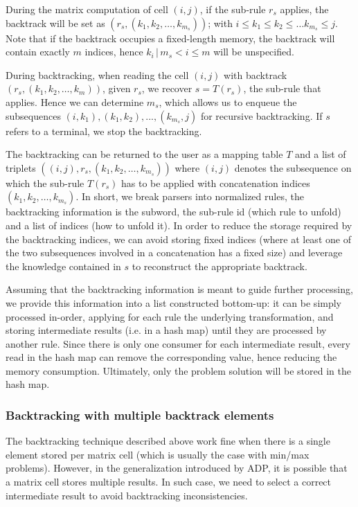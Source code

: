 	\ule
	\item During the matrix computation of cell $(i,j)$, if the sub-rule $r_s$ applies, the backtrack will be set as $(r_s,(k_1,k_2,\ldots,k_{m_s}))$; with $i\le k_1\le k_2\le \ldots k_{m_s}\le j$. Note that if the backtrack occupies a fixed-length memory, the backtrack will contain exactly $m$ indices, hence $k_i\,|\,m_s<i\le m$ will be unspecified.
	\item During backtracking, when reading the cell $(i,j)$ with backtrack $(r_s,(k_1,k_2,\ldots,k_m))$, given $r_s$, we recover $s=T(r_s)$, the sub-rule that applies. Hence we can determine $m_s$, which allows us to enqueue the subsequences $(i,k_1), (k_1,k_2), ..., (k_{m_s},j)$ for recursive backtracking. If $s$ refers to a terminal, we stop the backtracking.
	\item The backtracking can be returned to the user as a mapping table $T$ and a list of triplets $((i,j),r_s,(k_1,k_2,\ldots,k_{m_s}))$ where $(i,j)$ denotes the subsequence on which the sub-rule $T(r_s)$ has to be applied with concatenation indices $(k_1,k_2,\ldots,k_{m_s})$.
\ole
In short, we break parsers into normalized rules, the backtracking information is the subword, the sub-rule id (which rule to unfold) and a list of indices (how to unfold it).
\ule
In order to reduce the storage required by the backtracking indices, we can avoid storing fixed indices (where at least one of the two subsequences involved in a concatenation has a fixed size) and leverage the knowledge contained in $s$ to reconstruct the appropriate backtrack.

Assuming that the backtracking information is meant to guide further processing, we provide this information into a list constructed bottom-up: it can be simply processed in-order, applying for each rule the underlying transformation, and storing intermediate results (i.e. in a hash map) until they are processed by another rule. Since there is only one consumer for each intermediate result, every read in the hash map can remove the corresponding value, hence reducing the memory consumption. Ultimately, only the problem solution will be stored in the hash map.

\subsubsection{Backtracking with multiple backtrack elements}
The backtracking technique described above work fine when there is a single element stored per matrix cell (which is usually the case with min/max problems). However, in the generalization introduced by ADP, it is possible that a matrix cell stores multiple results. In such case, we need to select a correct intermediate result to avoid backtracking inconsistencies.

